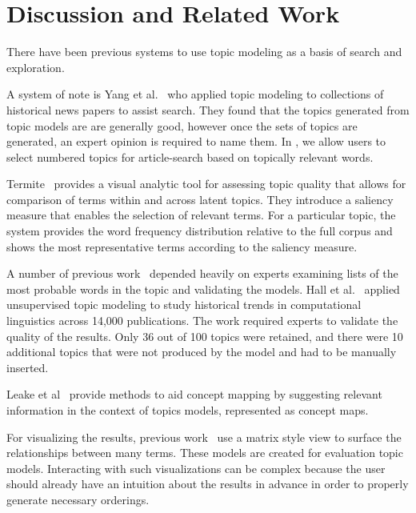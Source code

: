 
\section{Discussion and Related Work}

There have been previous systems to use topic modeling as a basis of
search and exploration. 

A system of note is Yang et al.~\cite{yang2011topic} who applied topic modeling to 
collections of historical news papers to assist search. They 
found that the topics generated from topic models are 
are generally good, however once the sets of topics are 
generated, an expert opinion is required to name them. 
In \system, we allow users to select numbered topics for article-search 
based on topically relevant words.



Termite~\cite{2012-termite} provides a visual analytic tool for assessing topic quality that allows for comparison of terms within and across latent topics. They introduce a saliency measure that enables the selection of relevant terms. For a particular topic, the system provides the word frequency distribution relative to the full corpus and shows the most representative terms according to the saliency measure.

A number of previous work~\cite{chang2009reading,mimno2011optimizing,newman2010evaluating} depended heavily on experts examining lists of the most probable words in the topic and validating the models. Hall et al.~\cite{hall2008studying} applied unsupervised topic modeling to study historical trends in computational linguistics across 14,000 publications. The work required experts  to validate the quality of the results. Only 36 out of 100 topics were retained, and there were 10 additional topics that were not produced by the model and had to be manually inserted.

Leake et al~\cite{leake2003topic} provide methods to aid concept mapping by suggesting relevant information in the context of topics models, represented as concept maps. 

For visualizing the results, previous work~\cite{2012-termite,bertin1983semiology,henry2007matlink} use
 a matrix style view to surface the relationships between many terms. 
These models are created for evaluation topic models.
Interacting with such visualizations can be complex because the user should
already have an intuition about the results in advance in order to properly generate necessary
orderings.






